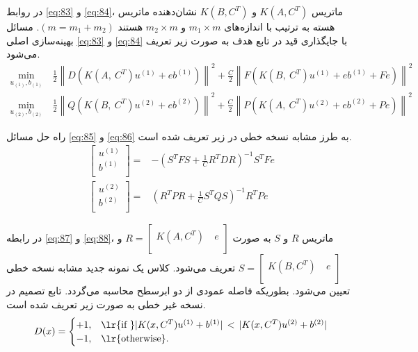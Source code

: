 در روابط \ref{eq:83} و \ref{eq:84}، ماتریس  $K(A,{{C}^{T}})$ و $K(B,{{C}^{T}})$  نشان‌دهنده ماتریس هسته به ترتیب با اندازه‌های  $m_1 \times m$ و  $m_2 \times m$ هستند $(m=m_1+m_2)$. مسائل بهینه‌سازی اصلی \ref{eq:83} و \ref{eq:84} با جایگذاری قید در تابع هدف به صورت زیر تعریف می‌شود.
\begin{equation}\label{eq:85}
\begin{split}
\mathop{{ min}}\limits_{u_{(1)} ,b_{(1)}}~ & \frac{1}{2}\left\|D(K(A,~{{C}^{T}}){{u}^{\left( 1 \right)}}+e{{b}^{\left( 1 \right)}})\right\|^{2} +\frac{C}{2}\left\|F(K(B,~{{C}^{T}}){{u}^{\left( 1 \right)}}+e{{b}^{\left( 1 \right)}}+F{{e}})\right\|^{2}
\end{split}
\end{equation}
\begin{equation}\label{eq:86}
\begin{split}
\mathop{{ min}}\limits_{u_{(2)} ,b_{(2)}}~ & \frac{1}{2}\left\|Q(K(B,~{{C}^{T}} ){{u}^{\left( 2 \right)}}+e{{b}^{\left( 2 \right)}})\right\|^{2} +\frac{C}{2}\left\|P(K(A,~{{C}^{T}} ){{u}^{\left( 2 \right)}}+e{{b}^{\left( 2 \right)}}+P{{e}})\right\|^{2}
\end{split}
\end{equation}

راه حل مسائل \ref{eq:85} و \ref{eq:86} به طرز مشابه نسخه خطی در زیر تعریف شده است.
\begin{align}
\left[\begin{matrix}
{{u}^{(1)}}  \\
{{b}^{(1)}}  \\
\end{matrix} \right]= & -{({{S}^{T}}FS+\frac{1}{C}{{R}^{T}}DR)^{-1}}{{S}^{T}}Fe \label{eq:87} \\
\left[ \begin{matrix}
{{u}^{(2)}}  \\
{{b}^{(2)}}  \\
\end{matrix} \right]= & {({{R}^{T}}PR+\frac{1}{C}{{S}^{T}}QS)^{-1}}{{R}^{T}}Pe \label{eq:88}
\end{align}

در رابطه \ref{eq:87} و \ref{eq:88}، ماتریس $R$ و $S$  به صورت  $R=\left[ \begin{matrix} K(A,{{C}^{T}})\ & e  \\ \end{matrix} \right]$ و   $S=\left[ \begin{matrix} K(B,{{C}^{T}})\ & e  \\ \end{matrix} \right]$ تعریف می‌شود. کلاس یک نمونه جدید مشابه نسخه خطی تعیین می‌شود. بطوریکه فاصله عمودی از دو ابرسطح محاسبه می‌گردد. تابع تصمیم در نسخه غیر خطی به صورت زیر تعریف شده است. 
\begin{equation}\label{eq:89}
D(x) =
\begin{cases}
+1, & \textrm{\lr{if }} |K(x,{C}^{T}){{u}^{(1)}}+{{b}^{(1)}}|\, < \, |K(x,{C}^{T}){{u}^{(2)}}+{{b}^{(2)}}|  \\
-1, & \textrm{\lr{otherwise}}.
\end{cases}
\end{equation}

